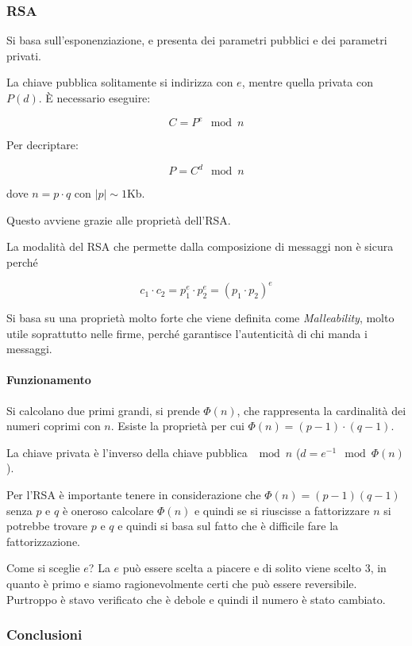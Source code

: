 \subsubsection{RSA}

Si basa sull'esponenziazione, e presenta dei parametri pubblici e dei parametri
privati.


La chiave pubblica solitamente si indirizza con $e$, mentre quella privata con
$P(d)$. È necessario eseguire:

\[ C = P^e \mod n \]

Per decriptare:

\[ P = C^d \mod n \]

dove $n = p \cdot q$ con $|p| \sim 1$Kb.

Questo avviene grazie alle proprietà dell'RSA.

La modalità del RSA che permette dalla composizione di messaggi non è sicura
perché

\[ c_1 \cdot c_2 = p_1^e \cdot p_2^e = (p_1 \cdot p_2)^e\]


Si basa su una proprietà molto forte che viene definita come
\textit{Malleability}, molto utile soprattutto nelle firme, perché garantisce
l'autenticità di chi manda i messaggi.


\paragraph{Funzionamento}

Si calcolano due primi grandi, si prende $\Phi(n)$, che rappresenta
la cardinalità dei numeri coprimi con $n$.
Esiste la proprietà per cui $\Phi(n) = (p-1) \cdot (q-1)$.

La chiave privata è l'inverso della chiave pubblica $\mod n$ ($d = e^{-1}
\mod \Phi(n)$).

Per l'RSA \`e importante tenere in considerazione che $\Phi(n) = (p-1)(q-1)$
senza $p$ e $q$ è oneroso calcolare $\Phi(n)$ e quindi se si riuscisse a
fattorizzare $n$ si potrebbe trovare $p$ e $q$ e quindi si basa sul fatto che è
difficile fare la fattorizzazione.

Come si sceglie $e$? La $e$ può essere scelta a piacere e di solito viene scelto
$3$, in quanto è primo e siamo ragionevolmente certi che può essere reversibile.
Purtroppo è stavo verificato che è debole e quindi il numero è stato cambiato.

\subsubsection{Conclusioni}

